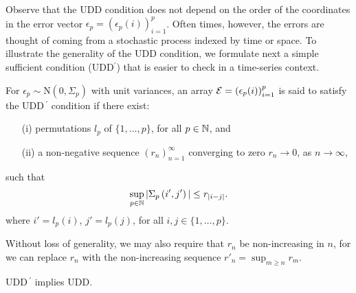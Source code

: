 Observe that the UDD condition does not depend on the order of the coordinates in the error 
vector $\epsilon_p = (\epsilon_p(i))_{i=1}^p$.  Often times, however, the errors are thought of 
coming from a stochastic process indexed by time or space.  To illustrate the generality of the 
UDD condition, we formulate next a simple sufficient condition (UDD$^\prime$) that is easier to 
check in a time-series context.

\begin{definition}\label{d:UDD-prime}
For $\epsilon_p \sim \mathrm{N}(0,\Sigma_p)$ with unit variances, an array ${\cal E} = \left(\epsilon_p(i)\right)_{i=1}^p$ is said to satisfy the UDD\,$^\prime$ condition if there 
exist:
\begin{enumerate}
    \item[(i)] permutations $l_p$ of $\{1,\ldots,p\}$, for all $p\in\mathbb N$, and
    \item[(ii)] a non-negative sequence $(r_n)_{n=1}^\infty$ converging to zero $r_n\to 0$, as $n\to\infty$,
\end{enumerate}
such that 
\begin{equation} \label{eq:weak-correlation}
    \sup_{p\in\mathbb N} |\Sigma_p\left(i',j'\right)| \le r_{|i-j|}.
\end{equation}
where $i' = l_p(i)$, $j' = l_p(j)$, for all $i,j\in\{1,\ldots,p\}$.
\end{definition}

\begin{remark}
Without loss of generality, we may also require that $r_n$ be non-increasing in $n$, for we can replace $r_n$ with the non-increasing sequence $r'_n = \sup_{m\ge n} r_m$.
\end{remark}

\begin{proposition} \label{prop:UDD-equivalent}
UDD\,$^\prime$ implies UDD.
\end{proposition} 

